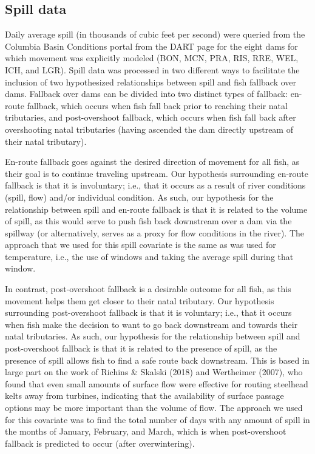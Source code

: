 \documentclass[
  12pt,
]{report}
\begin{document}
\hypertarget{spill-data}{%
\subsection{Spill data}\label{spill-data}}

Daily average spill (in thousands of cubic feet per second) were queried
from the Columbia Basin Conditions portal from the DART page for the
eight dams for which movement was explicitly modeled (BON, MCN, PRA,
RIS, RRE, WEL, ICH, and LGR). Spill data was processed in two different
ways to facilitate the inclusion of two hypothesized relationships
between spill and fish fallback over dams. Fallback over dams can be
divided into two distinct types of fallback: en-route fallback, which
occurs when fish fall back prior to reaching their natal tributaries,
and post-overshoot fallback, which occurs when fish fall back after
overshooting natal tributaries (having ascended the dam directly
upstream of their natal tributary).

En-route fallback goes against the desired direction of movement for all
fish, as their goal is to continue traveling upstream. Our hypothesis
surrounding en-route fallback is that it is involuntary; i.e., that it
occurs as a result of river conditions (spill, flow) and/or individual
condition. As such, our hypothesis for the relationship between spill
and en-route fallback is that it is related to the volume of spill, as
this would serve to push fish back downstream over a dam via the
spillway (or alternatively, serves as a proxy for flow conditions in the
river). The approach that we used for this spill covariate is the same
as was used for temperature, i.e., the use of windows and taking the
average spill during that window.

In contrast, post-overshoot fallback is a desirable outcome for all
fish, as this movement helps them get closer to their natal tributary.
Our hypothesis surrounding post-overshoot fallback is that it is
voluntary; i.e., that it occurs when fish make the decision to want to
go back downstream and towards their natal tributaries. As such, our
hypothesis for the relationship between spill and post-overshoot
fallback is that it is related to the presence of spill, as the presence
of spill allows fish to find a safe route back downstream. This is based
in large part on the work of Richins \& Skalski (2018) and Wertheimer
(2007), who found that even small amounts of surface flow were effective
for routing steelhead kelts away from turbines, indicating that the
availability of surface passage options may be more important than the
volume of flow. The approach we used for this covariate was to find the
total number of days with any amount of spill in the months of January,
February, and March, which is when post-overshoot fallback is predicted
to occur (after overwintering).
\end{document}
